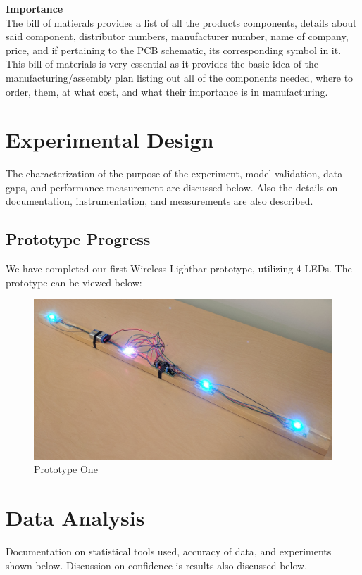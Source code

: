 \documentclass[12pt]{article}
\begin{document}
{{{{{{{	 \noindent \textbf{Importance}\\
	 \indent The bill of matierals provides a list of all the products components, details about said component, distributor numbers, manufacturer number, name of company, price, and if pertaining to the PCB schematic, its corresponding symbol in it. This bill of materials is very essential as it provides the basic idea of the manufacturing/assembly plan listing out all of the components needed, where to order, them, at what cost, and what their importance is in manufacturing. 
	
	\newpage

\section{Experimental Design}
	The characterization of the purpose of the experiment, model validation, data gaps, and performance measurement are discussed below. Also the details on documentation, instrumentation, and measurements are also described.
	
		\subsection{Prototype Progress}
		We have completed our first Wireless Lightbar prototype, utilizing 4 LEDs. The prototype can be viewed below:
		
		\begin{figure}[ht!]
			\centering
			\includegraphics[width=140mm]{assets/prototype.jpg}
			\caption{Prototype One}
		\end{figure}
  	
	\newpage	
  	
\section{Data Analysis}
	Documentation on statistical tools used, accuracy of data, and experiments shown below. Discussion on confidence is results also discussed below.

}}}}}}}
\end{document}
